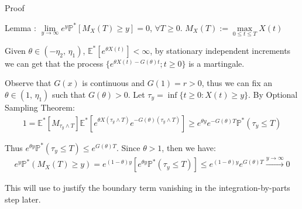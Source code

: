 \documentclass{beamer}
\begin{document}
\begin{frame}{Proof}

    {\footnotesize \footnotesize
    \par Lemma :  \(\lim\limits_{y\to\infty}e^{y}\mathbb{P}^{*}[M_{X}(T)\geq y]=0\), \(\forall T\geq 0\). \(M_{X}(T):=\max\limits_{0\leq t\leq T}X(t)\)
    \par [Proof]
    \vspace{1em}
    \par Given \(\theta\in(-\eta_{2},\,\eta_{1})\), $\mathbb{E}^*[e^{\theta X(t)}]<\infty$, 
    by stationary independent increments we can get that the process \(\{e^{\theta X(t)-G(\theta)t}; t\geq 0\}\) is a martingale.
     \vspace{1em}
    \par Observe that $G(x)$ is continuous and \(G(1)=r>0\), thus we can fix an \(\theta\in(1,\,\eta_{1})\) such that \(G(\theta)>0\).
     Let $\tau_y = \inf\{t \geq 0 : X(t) \geq y\}$. By Optional Sampling Theorem:
      \vspace{1em}
    \begin{align*}
      1 = \mathbb{E}^*[M_{\tau_y \land T}]  \mathbb{E}^* \left[ e^{\theta X(\tau_y \land T)} e^{-G(\theta)(\tau_y \land T)} \right] 
      \geq e^{\theta y} e^{-G(\theta)T} \mathbb{P}^* (\tau_y \leq T)
    \end{align*}
     \vspace{1em}
    \par Thus $e^{\theta y} \mathbb{P}^* (\tau_y \leq T) \leq e^{G(\theta)T}$. Since $\theta > 1$, then we have:
     \vspace{1em}
    \begin{align*}
      e^y \mathbb{P}^* (M_X(T) \geq y) = 
      e^{(1-\theta)y} \left[ e^{\theta y} \mathbb{P}^* (\tau_y \leq T) \right] \leq e^{(1-\theta)y} e^{G(\theta)T} \xrightarrow{y \to \infty} 0
    \end{align*}
    \par This will use to justify the boundary term vanishing in the integration-by-parts step later.
    }
    
\end{frame}
\end{document}
